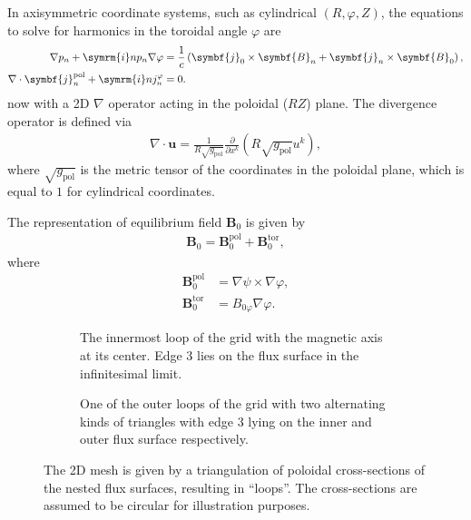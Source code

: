 \documentclass[a4paper, 10pt, english]{article}
\let\temp\vartheta
\let\vartheta\theta
\let\theta\temp
\let\temp\varphi
\let\varphi\phi
\let\phi\temp
\let\vec\symbf
\newcommand*\im{\ensuremath{\symrm{i}}}
\newcommand*\pd[2][]{\ensuremath{\frac{\partial #1}{\partial #2}}}
\newcommand*\pol{\ensuremath{\textrm{pol}}}
\newcommand*\tor{\ensuremath{\textrm{tor}}}
\begin{document}
In axisymmetric coordinate systems, such as cylindrical $(R, \phi, Z)$, the equations to solve for harmonics in the toroidal angle $\phi$ are
\begin{align}
  \nabla p_{n} + \im n p_{n} \nabla \phi &= \frac{1}{c} \left( \vec{j}_{0} \times \vec{B}_{n} + \vec{j}_{n} \times \vec{B}_{0} \right), \label{eq:mhd-2} \\
  \nabla \cdot \vec{j}_{n}^{\pol}+ \im n j_{n}^{\phi} &= 0. \label{eq:divfree-2}
\end{align}
now with a 2D $\nabla$ operator acting in the poloidal ($RZ$) plane. The divergence operator is defined via
\begin{gather*}
  \nabla \cdot \vec{u} = \frac{1}{R \sqrt{g_{\pol}}} \pd{x^{k}} (R \sqrt{g_{\pol}} u^{k}),
\end{gather*}
where $\sqrt{g_{\pol}}$ is the metric tensor of the coordinates in the poloidal plane, which is equal to $1$ for cylindrical coordinates.

The representation of equilibrium field $\vec{B}_{0}$ is given by
\begin{gather}
  \vec{B}_{0} = \vec{B}_{0}^{\pol} + \vec{B}_{0}^{\tor},
\end{gather}
where 
\begin{align}
  \vec{B}_{0}^{\pol} &= \nabla \psi \times \nabla \phi, \\
  \vec{B}_{0}^{\tor} &= B_{0 \phi} \nabla \phi.
\end{align}

\begin{figure}
  \centering
  \begin{subfigure}[b]{0.33\textwidth}
    \centering
    
    \caption{The innermost loop of the grid with the magnetic axis at its center. Edge 3 lies on the flux surface in the infinitesimal limit.}
    \label{fig:grid0}
  \end{subfigure}
  \quad
  \begin{subfigure}[b]{0.5\textwidth}
    \centering
    
    \caption{One of the outer loops of the grid with two alternating kinds of triangles with edge 3 lying on the inner and outer flux surface respectively.}
    \label{fig:grid1}
  \end{subfigure}
  \caption{The 2D mesh is given by a triangulation of poloidal cross-sections of the nested flux surfaces, resulting in \enquote{loops}. The cross-sections are assumed to be circular for illustration purposes.}
  \label{fig:grid}
\end{figure}
\end{document}

